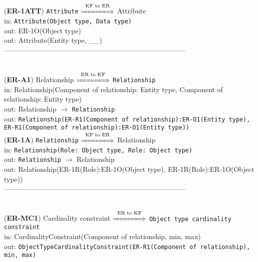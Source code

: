 \documentclass[sn-mathphys]{sn-jnl}
\begin{document}
{{{({\bf ER-1ATT}) {\tt Attribute} $\overset{\text{KF to ER}}{\xLongrightarrow{\hspace*{1.4cm}}}$ {Attribute}\\
\hspace*{0.3cm}in: {\tt Attribute(Object type, Data type)}\\
\hspace*{0.5cm}out:  {ER-1O(Object type)} \\
\hspace*{0.5cm}out:  {Attribute(Entity type, \_\_)}\\

------------------------------------------------------------------------------
\\ \

({\bf ER-A1}) {Relationship} $\overset{\text{ER to KF}}{\xLongrightarrow{\hspace*{1.4cm}}}$ {\tt Relationship}\\
\hspace*{0.3cm}in: {Relationship(Component of relationship: Entity type, Component of relationship: Entity type)} \\
\hspace*{0.5cm}out:  {Relationship} $\rightarrow$ {\tt Relationship}\\
\hspace*{0.5cm}out:  {\tt Relationship(ER-R1(Component of relationship):ER-O1(Entity type), ER-R1(Component of relationship):ER-O1(Entity type))}\\

({\bf ER-1A}) {\tt Relationship} $\overset{\text{KF to ER}}{\xLongrightarrow{\hspace*{1.4cm}}}$ {Relationship}\\
\hspace*{0.3cm}in: {\tt Relationship(Role: Object type, Role: Object type)} \\
\hspace*{0.5cm}out:  {\tt Relationship} $\rightarrow$ {Relationship}\\
\hspace*{0.5cm}out:  {Relationship(ER-1R(Role):ER-1O(Object type), ER-1R(Role):ER-1O(Object type))}\\

------------------------------------------------------------------------------
\\ \

({\bf ER-MC1}) {Cardinality constraint} $\overset{\text{ER to KF}}{\xLongrightarrow{\hspace*{1.4cm}}}$ {\tt Object type cardinality constraint}\\
\hspace*{0.3cm}in: {CardinalityConstraint(Component of relationship, min, max)} \\
\hspace*{0.5cm}out:  {\tt ObjectTypeCardinalityConstraint(ER-R1(Component of relationship), min, max)}\\

}}}
\end{document}
